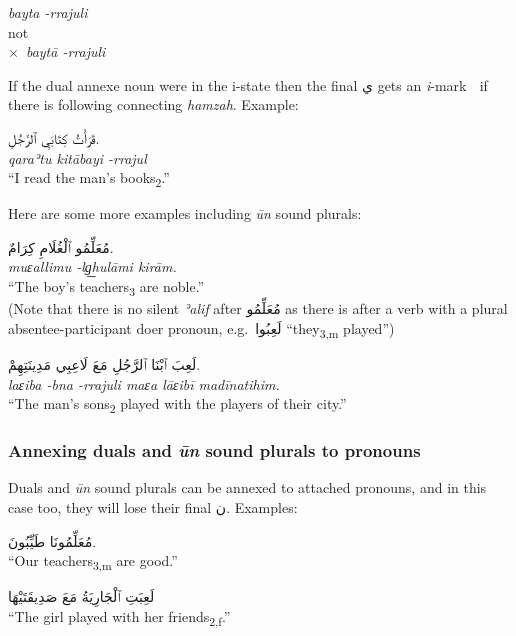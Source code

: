 \documentclass[
  10pt,
]{book}
\begin{document}
\emph{bayta -rrajuli}\\
not\\
\(\times\)~\emph{baytā -rrajuli}

If the dual annexe noun were in the i-state then the final \foreignlanguage{arabic}{ي} gets an \emph{i}-mark \emph{◌ِ} if there is following connecting \emph{hamzah}. Example:

\foreignlanguage{arabic}{قَرَأْتُ کِتَابَيِ ٱلرَّجُلِ.}\\
\emph{qaraʾtu kitābayi -rrajul}\\
\enquote{I read the man's books\textsubscript{2}.}

Here are some more examples including \emph{ūn} sound plurals:

\foreignlanguage{arabic}{مُعَلِّمُو ٱلْغُلَامِ کِرَامٌ.}\\
\emph{muɛallimu -lg͟hulāmi kirām.}\\
\enquote{The boy's teachers\textsubscript{3} are noble.}\\
(Note that there is no silent \emph{ʾalif} after \foreignlanguage{arabic}{مُعَلِّمُو} as there is after a verb with a plural absentee-participant doer pronoun, e.g.~\foreignlanguage{arabic}{لَعِبُوا} \enquote{they\textsubscript{3,m} played})

\foreignlanguage{arabic}{لَعِبَ ٱبْنَا ٱلرَّجُلِ مَعَ لَاعِبِي مَدِينَتِهِمْ.}\\
\emph{laɛiba -bna -rrajuli maɛa lāɛibī madīnatihim.}\\
\enquote{The man's sons\textsubscript{2} played with the players of their city.}

\subsubsection{\texorpdfstring{Annexing duals and \emph{ūn} sound plurals to pronouns}{Annexing duals and ūn sound plurals to pronouns}}\label{annexing-duals-and-un-sound-plurals-to-pronouns}

Duals and \emph{ūn} sound plurals can be annexed to attached pronouns, and in this case too, they will lose their final \foreignlanguage{arabic}{ن}. Examples:

\foreignlanguage{arabic}{مُعَلِّمُونَا طَيِّبُونَ.}\\
\enquote{Our teachers\textsubscript{3,m} are good.}

\foreignlanguage{arabic}{لَعِبَتِ ٱلْجَارِيَةُ مَعَ صَدِيقَتَيْهَا}\\
\enquote{The girl played with her friends\textsubscript{2,f}.}
\end{document}

